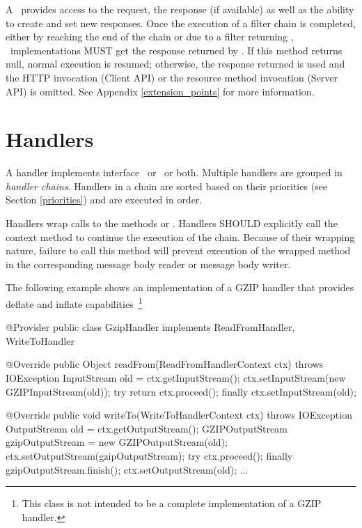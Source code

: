 A \FilterContext\ provides access to the request, the response (if available) as well as the ability to create and set new responses. Once the execution of a filter chain is completed, either by reaching the end of the chain or due to a filter returning , \jaxrs\ implementations MUST get the response returned by . If this method returns null, normal execution is resumed; otherwise, the response returned is used and the HTTP invocation (Client API) or the resource method invocation (Server API) is omitted.  See Appendix \ref{extension_points} for more information.

\section{Handlers}

A handler implements interface \ReadFromHandler\ or \WriteToHandler\ or both. Multiple handlers are grouped in \emph{handler chains}. Handlers in a chain are sorted based on their priorities (see Section \ref{priorities}) and are executed in order. 

Handlers wrap calls to the methods  or . Handlers SHOULD explicitly call the context method   to continue the execution of the chain. Because of their wrapping nature, failure to call this method will prevent execution of the wrapped method in the corresponding message body reader or message body writer.

The following example shows an implementation of a GZIP handler that provides deflate and inflate capabilities~\footnote{This class is not intended to be a complete implementation of a GZIP handler.}

\begin{listing}{1}
@Provider
public class GzipHandler implements ReadFromHandler, WriteToHandler {

    @Override
    public Object readFrom(ReadFromHandlerContext ctx) throws IOException {
        InputStream old = ctx.getInputStream();
        ctx.setInputStream(new GZIPInputStream(old));
        try {
            return ctx.proceed();
        } finally {
            ctx.setInputStream(old);
        }
    }

    @Override
    public void writeTo(WriteToHandlerContext ctx) throws IOException {
        OutputStream old = ctx.getOutputStream();
        GZIPOutputStream gzipOutputStream = new GZIPOutputStream(old);
        ctx.setOutputStream(gzipOutputStream);
        try {
            ctx.proceed();
        } finally {
            gzipOutputStream.finish();
            ctx.setOutputStream(old);
        }
    }
    ...
}
\end{listing}

